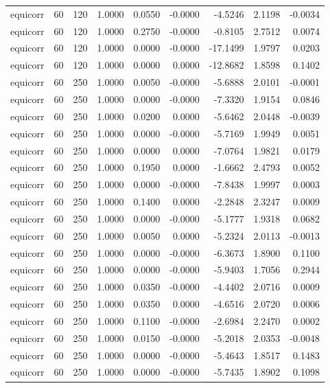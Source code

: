 \begin{tabular}{lrrrrrrrr}
equicorr & 60 & 120 & 1.0000 & 0.0550 & -0.0000 & -4.5246 & 2.1198 & -0.0034 \\
equicorr & 60 & 120 & 1.0000 & 0.2750 & -0.0000 & -0.8105 & 2.7512 & 0.0074 \\
equicorr & 60 & 120 & 1.0000 & 0.0000 & -0.0000 & -17.1499 & 1.9797 & 0.0203 \\
equicorr & 60 & 120 & 1.0000 & 0.0000 & 0.0000 & -12.8682 & 1.8598 & 0.1402 \\
equicorr & 60 & 250 & 1.0000 & 0.0050 & -0.0000 & -5.6888 & 2.0101 & -0.0001 \\
equicorr & 60 & 250 & 1.0000 & 0.0000 & -0.0000 & -7.3320 & 1.9154 & 0.0846 \\
equicorr & 60 & 250 & 1.0000 & 0.0200 & 0.0000 & -5.6462 & 2.0448 & -0.0039 \\
equicorr & 60 & 250 & 1.0000 & 0.0000 & -0.0000 & -5.7169 & 1.9949 & 0.0051 \\
equicorr & 60 & 250 & 1.0000 & 0.0000 & 0.0000 & -7.0764 & 1.9821 & 0.0179 \\
equicorr & 60 & 250 & 1.0000 & 0.1950 & 0.0000 & -1.6662 & 2.4793 & 0.0052 \\
equicorr & 60 & 250 & 1.0000 & 0.0000 & -0.0000 & -7.8438 & 1.9997 & 0.0003 \\
equicorr & 60 & 250 & 1.0000 & 0.1400 & 0.0000 & -2.2848 & 2.3247 & 0.0009 \\
equicorr & 60 & 250 & 1.0000 & 0.0000 & -0.0000 & -5.1777 & 1.9318 & 0.0682 \\
equicorr & 60 & 250 & 1.0000 & 0.0050 & 0.0000 & -5.2324 & 2.0113 & -0.0013 \\
equicorr & 60 & 250 & 1.0000 & 0.0000 & -0.0000 & -6.3673 & 1.8900 & 0.1100 \\
equicorr & 60 & 250 & 1.0000 & 0.0000 & -0.0000 & -5.9403 & 1.7056 & 0.2944 \\
equicorr & 60 & 250 & 1.0000 & 0.0350 & -0.0000 & -4.4402 & 2.0716 & 0.0009 \\
equicorr & 60 & 250 & 1.0000 & 0.0350 & 0.0000 & -4.6516 & 2.0720 & 0.0006 \\
equicorr & 60 & 250 & 1.0000 & 0.1100 & -0.0000 & -2.6984 & 2.2470 & 0.0002 \\
equicorr & 60 & 250 & 1.0000 & 0.0150 & -0.0000 & -5.2018 & 2.0353 & -0.0048 \\
equicorr & 60 & 250 & 1.0000 & 0.0000 & -0.0000 & -5.4643 & 1.8517 & 0.1483 \\
equicorr & 60 & 250 & 1.0000 & 0.0000 & -0.0000 & -5.7435 & 1.8902 & 0.1098 \\

\end{tabular}
